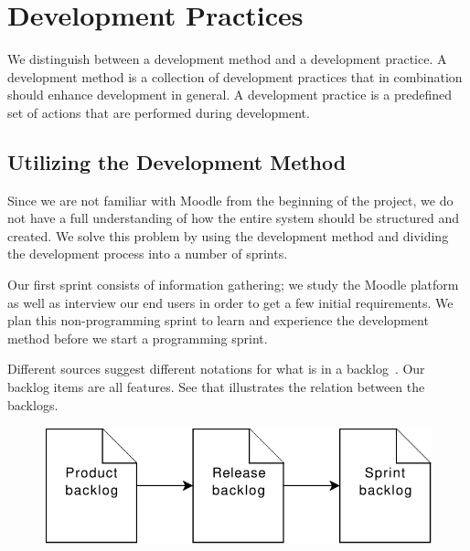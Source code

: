 \chapter{Development Practices} %
\label{sec:developmentpractice}
%

We distinguish between a development method and a development practice.
A development method is a collection of development practices that in combination should enhance development in general. 
A development practice is a predefined set of actions that are performed during development.



\section{Utilizing the Development Method}
Since we are not familiar with Moodle from the beginning of the project, we do not have a full understanding of how the entire system should be structured and created.
We solve this problem by using the development method \scrum{} and dividing the development process into a number of sprints.


Our first sprint consists of information gathering; we study the Moodle platform as well as interview our end users in order to get a few initial requirements. 
We plan this non-programming sprint to learn and experience the \scrum{} development method before we start a programming sprint.

Different sources suggest different notations for what is in a backlog~\cite[p.~17]{scrumchecklist}\cite[pp.~123-124]{Larman04}.
Our backlog items are all features. 
See  that illustrates the relation between the backlogs. 
\begin{figure}%
\center
\includegraphics[scale=0.50]{images/backlogs}%
%
\label{fig:backlog}%
\end{figure}

